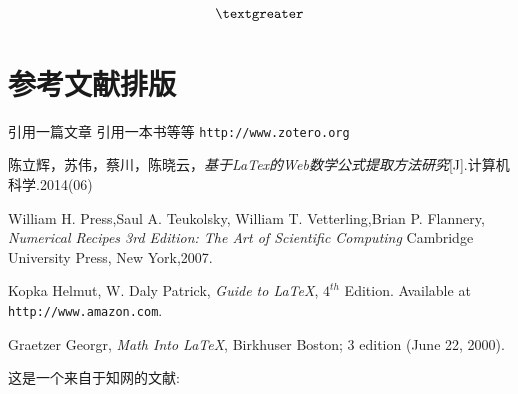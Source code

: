 \documentclass[12pt]{ctexbook}  %
\begin{document}
$$\textgreater$$


	\chapter{参考文献排版}
	引用一篇文章\cite{artcle1} 引用一本书\cite{book1}等等	\texttt{http://www.zotero.org}
	\begin{thebibliography}{99}
		陈立辉，苏伟，蔡川，陈晓云，\emph{基于LaTex的Web数学公式提取方法研究}[J].计算机科学.2014(06)
		
		William H. Press,Saul A. Teukolsky, William T. Vetterling,Brian P. Flannery,
		\emph{Numerical Recipes 3rd Edition: The Art of Scientific Computing} Cambridge University Press, New York,2007.
		
		 Kopka Helmut, W. Daly Patrick,
		\emph{Guide to \LaTeX}, $4^{th}$ Edition.
		Available at \texttt{http://www.amazon.com}.
		
		 Graetzer Georgr, \emph{Math Into \LaTeX},
		Birkhuser Boston; 3 edition (June 22, 2000).
	\end{thebibliography}
	这是一个来自于知网的文献:\cite{dosovitskiy2020image}
	
	
	
\end{document}

